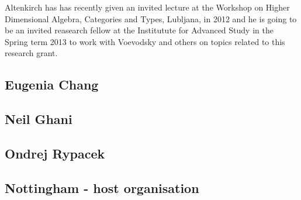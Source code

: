 \documentclass[twocolumn,a4paper,11pt]{article}
\renewcommand{\cite}[1]{{\tt[#1]}}
\begin{document}
Altenkirch has has recently given an invited lecture at the Workshop on
Higher Dimensional Algebra, Categories and Types, Lubljana, in 2012
and he is going to be an invited reasearch fellow at the
Institutute for Advanced Study in the Spring term 2013 to work with
Voevodsky and others on topics related to this research grant.
 



\subsection*{Eugenia Chang}

\subsection*{Neil Ghani}

\subsection*{Ondrej Rypacek}

\subsection*{Nottingham - host organisation}
\end{document}
